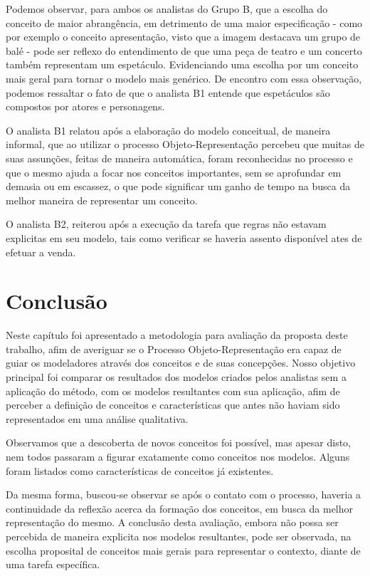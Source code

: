 Podemos observar, para ambos os analistas do Grupo B, que a escolha do conceito de maior abrangência, em detrimento de uma maior especificação - como por exemplo o conceito apresentação, visto que a imagem destacava um grupo de balé - pode ser reflexo do entendimento de que uma peça de teatro e um concerto também representam um espetáculo. Evidenciando uma escolha por um conceito mais geral para tornar o modelo mais genérico. De encontro com essa observação, podemos ressaltar o fato de que o analista B1 entende que espetáculos são compostos por atores e personagens.

O analista B1 relatou após a elaboração do modelo conceitual, de maneira informal, que ao utilizar o processo Objeto-Representação percebeu que muitas de suas assunções, feitas de maneira automática, foram reconhecidas no processo e que o mesmo ajuda a focar nos conceitos importantes, sem se aprofundar em demasia ou em escassez, o que pode significar um ganho de tempo na busca da melhor maneira de representar um conceito.

O analista B2, reiterou após a execução da tarefa que regras não estavam explicitas em seu modelo, tais como verificar se haveria assento disponível ates de efetuar a venda.

\section{\hspace*{3pt} Conclusão}
\label{sec:conclusaoAvaliacao}

Neste capítulo foi apresentado a metodologia para avaliação da proposta deste trabalho, afim de averiguar se o Processo Objeto-Representação era capaz de guiar os modeladores através dos conceitos e de suas concepções. Nosso objetivo principal foi comparar os resultados dos modelos criados pelos analistas sem a aplicação do método, com os modelos resultantes com sua aplicação, afim de perceber a definição de conceitos e características que antes não haviam sido representados em uma análise qualitativa. 

Observamos que a descoberta de novos conceitos foi possível, mas apesar disto, nem todos passaram a figurar exatamente como conceitos nos modelos. Alguns foram listados como características de conceitos já existentes. 

Da mesma forma, buscou-se observar se após o contato com o processo, haveria a continuidade da reflexão acerca da formação dos conceitos, em busca da melhor representação do mesmo. A conclusão desta avaliação, embora não possa ser percebida de maneira explicita nos modelos resultantes, pode ser observada, na escolha proposital de conceitos mais gerais para representar o contexto, diante de uma tarefa específica.

